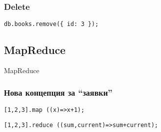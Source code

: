 \documentclass{beamer}
\begin{document}
\begin{frame}[fragile]
\frametitle{Delete}

\begin{lstlisting}
db.books.remove({ id: 3 });
\end{lstlisting}


\end{frame}

\subsection{MapReduce}

\begin{frame}
\centerline{MapReduce}
\end{frame}


\begin{frame}[fragile]
\frametitle{Нова концепция за ``заявки''}


\lstset{language=JavaScript}



\begin{lstlisting}
[1,2,3].map ((x)=>x+1);
\end{lstlisting}

\vspace{0.2cm}
\pause

\begin{lstlisting}
[1,2,3].reduce ((sum,current)=>sum+current);
\end{lstlisting}


\end{frame}
\end{document}
